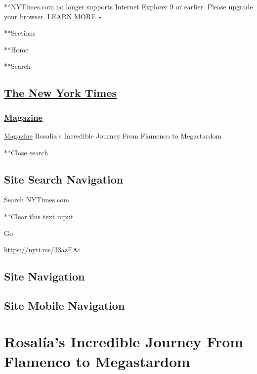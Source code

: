 **NYTimes.com no longer supports Internet Explorer 9 or earlier. Please
upgrade your browser.
\href{http://www.nytimes3xbfgragh.onion/content/help/site/ie9-support.html}{LEARN
MORE »}

**Sections

**Home

**Search

\hypertarget{the-new-york-times}{%
\subsection{\texorpdfstring{\href{http://www.nytimes3xbfgragh.onion/}{The
New York Times}}{The New York Times}}\label{the-new-york-times}}

\hypertarget{-magazine-}{%
\subsubsection{\texorpdfstring{
\href{https://www.nytimes3xbfgragh.onion/section/magazine}{Magazine}
}{ Magazine }}\label{-magazine-}}

 \href{https://www.nytimes3xbfgragh.onion/section/magazine}{Magazine}
\textbar{}Rosalía's Incredible Journey From Flamenco to Megastardom

**Close search

\hypertarget{site-search-navigation}{%
\subsection{Site Search Navigation}\label{site-search-navigation}}

Search NYTimes.com

**Clear this text input

Go

\url{https://nyti.ms/33azEAc}

\hypertarget{site-navigation}{%
\subsection{Site Navigation}\label{site-navigation}}

\hypertarget{site-mobile-navigation}{%
\subsection{Site Mobile Navigation}\label{site-mobile-navigation}}

\hypertarget{rosaluxedas-incredible-journey-from-flamenco-to-megastardom}{%
\section{Rosalía's Incredible Journey From Flamenco to
Megastardom}\label{rosaluxedas-incredible-journey-from-flamenco-to-megastardom}}

